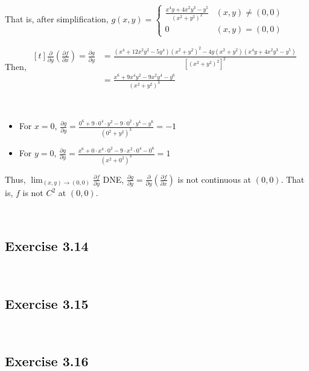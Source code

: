 \documentclass[11pt,fleqn]{book} %
\begin{document}
That is, after simplification, $g(x,y) = 
    \begin{cases}
        \frac{x^4y + 4x^2y^3 - y^5}{(x^2 + y^2)^2} & (x,y) \neq (0,0) \\
        0                                          & (x,y) = (0,0)
    \end{cases}$

Then, 
$\begin{aligned}[t]
    \frac{\partial}{\partial y} \left(\frac{\partial f}{\partial x}\right) = \frac{\partial g}{\partial y}
     & = \frac{(x^4 + 12x^2y^2 - 5y^4)(x^2 + y^2)^2 - 4y(x^2 + y^2)(x^4y + 4x^2y^3 - y^5)}{\left[(x^2 + y^2)^2\right]^2} \\
     & = \frac{x^6 + 9x^4y^2 - 9x^2y^4 - y^6}{(x^2 + y^2)^3}
\end{aligned}$

{~~~}

\begin{itemize}
    \item For $x = 0$, $\frac{\partial g}{\partial y} = \frac{0^6 + 9 \cdot 0^4 \cdot y^2 - 9 \cdot 0^2 \cdot y^4 - y^6}{(0^2 + y^2)^3} = -1$

    \item For $y = 0$, $\frac{\partial g}{\partial y} = \frac{x^6 + 0 \cdot x^4 \cdot 0^2 - 9 \cdot x^2 \cdot 0^4 - 0^6}{(x^2 + 0^2)^3} = 1$
\end{itemize}

Thus, $\lim_{(x,y)\to(0,0)} \frac{\partial f}{\partial y}$ DNE, $\frac{\partial g}{\partial y} = \frac{\partial}{\partial y}\left( \frac{\partial f}{\partial x} \right)$ is not continuous at $(0,0)$. That is, $f$ is not $C^2$ at $(0,0)$. 

{~~~}

\subsection*{Exercise 3.14}

{~~~}

\subsection*{Exercise 3.15}

{~~~}

\subsection*{Exercise 3.16}

{~~~}
\end{document}
